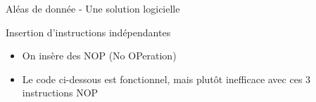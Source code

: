 %
\begin{Frame}{Aléas de donnée - Une solution logicielle}

  \begin{block}{Insertion d'instructions indépendantes}
       \begin{center}
 	\begin{itemize}
          \item On insère des NOP (No OPeration)
          \item Le code ci-dessous est fonctionnel, mais plutôt inefficace avec ces 3 instructions NOP 
        \end{itemize}
       \end{center}
      \end{block}   

\vspace{-0.1cm}
        \begin{center}
        \end{center}
 


\end{Frame}


